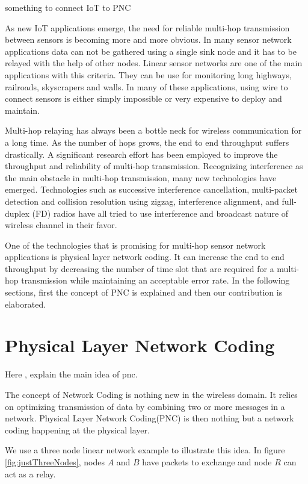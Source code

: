 \label{chapter:multi}
something to connect IoT to PNC

As new IoT applications emerge, the need for reliable multi-hop transmission between sensors is becoming more and more obvious. In many sensor network applications data can not be gathered using a single sink node and it has to be relayed with the help of other nodes. Linear sensor networks are one of the main applications with this criteria. They can be use for monitoring long highways, railroads, skyscrapers and walls. In many of these applications, using wire to connect sensors is either simply impossible or very expensive to deploy and maintain.

Multi-hop relaying has always been a bottle neck for wireless communication for a long time. As the number of hops grows, the end to end throughput suffers drastically. A significant research effort has been employed to improve the throughput and reliability of multi-hop transmission. Recognizing interference as the main obstacle in multi-hop transmission, many new technologies have emerged. Technologies such as successive interference cancellation\cite{alvandi2015delay}, multi-packet detection and collision resolution using zigzag\cite{mzig}, interference alignment\cite{4567443, 7218598}, and full-duplex (FD) radios\cite{fullduplex} have all tried to use interference and broadcast nature of wireless channel in their favor.

One of the technologies that is promising for multi-hop sensor network applications is physical layer network coding. It can increase the end to end throughput by decreasing the number of time slot that are required for a multi-hop transmission while maintaining an acceptable error rate. In the following sections, first the concept of PNC is explained and then our contribution is elaborated.

\section{Physical Layer Network Coding}
Here , explain the main idea of pnc.

The concept of Network Coding is nothing new in the wireless domain. It relies on optimizing transmission of data by combining two or more messages in a network. Physical Layer Network Coding(PNC) is then nothing but a network coding happening at the physical layer.

We use a three node linear network example to illustrate this idea\cite{zhang2006hot}. In figure \ref{fig:justThreeNodes}, nodes $A$ and $B$ have packets to exchange and node $R$ can act as a relay.


